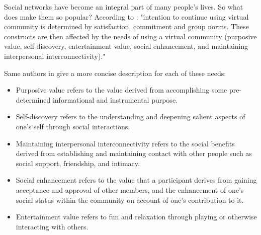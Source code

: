 \documentclass[fleqn,11pt]{olplainarticle}
\begin{document}
Social networks have become an integral part of many people's lives. So what does make them so popular? According to \cite{cheung2009understanding}: "intention to continue using virtual community is determined by satisfaction, commitment and group norms. These constructs are then affected by the needs of using a virtual community (purposive value, self-discovery, entertainment value, social enhancement, and maintaining interpersonal interconnectivity)."

Same authors in \cite{cheung2011online} give a more concise description for each of these needs: 
\begin{displayquote}
    \begin{itemize}
        \item Purposive value refers to the value derived from accomplishing some pre-determined informational and instrumental purpose.
        \item Self-discovery refers to the understanding and deepening salient aspects of one’s self through social interactions.
        \item Maintaining interpersonal interconnectivity refers to the social benefits derived from establishing and maintaining contact with other people such as social support, friendship, and intimacy.
        \item Social enhancement refers to the value that a participant derives from gaining acceptance and approval of other members, and the enhancement of one’s social status within the community on account of one’s contribution to it.
        \item Entertainment value refers to fun and relaxation through playing or otherwise interacting with others.
    \end{itemize}
\end{displayquote}
\end{document}

